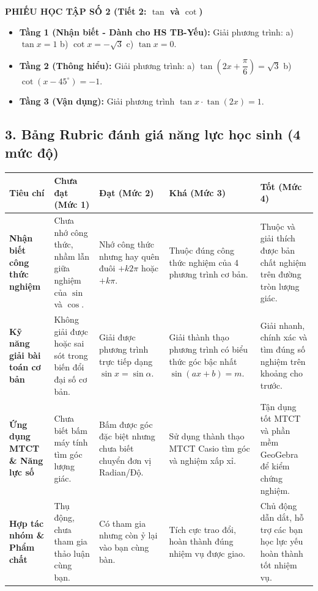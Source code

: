 \documentclass[12pt, a4paper]{article}
\begin{document}
\vspace{5pt}  
\noindent \textbf{PHIẾU HỌC TẬP SỐ 2 (Tiết 2: $\tan$ và $\cot$)}  
\begin{itemize}[leftmargin=0.6cm]  
    \item \textbf{Tầng 1 (Nhận biết - Dành cho HS TB-Yếu):}  
    Giải phương trình: a) $\tan x = 1$ \qquad b) $\cot x = -\sqrt{3}$ \qquad c) $\tan x = 0$.  
    \item \textbf{Tầng 2 (Thông hiểu):}  
    Giải phương trình: a) $\tan\left(2x + \dfrac{\pi}{6}\right) = \sqrt{3}$ \qquad b) $\cot\left(x - 45^\circ\right) = -1$.  
    \item \textbf{Tầng 3 (Vận dụng):}  
    Giải phương trình $\tan x \cdot \tan(2x) = 1$.  
\end{itemize}  
  
\subsection*{3. Bảng Rubric đánh giá năng lực học sinh (4 mức độ)}  
  
\begin{center}  
\small  
\begin{tabularx}{\textwidth}{|p{2.8cm}|X|X|X|X|}  
\hline  
\textbf{Tiêu chí} & \textbf{Chưa đạt (Mức 1)} & \textbf{Đạt (Mức 2)} & \textbf{Khá (Mức 3)} & \textbf{Tốt (Mức 4)} \\ \hline  
\textbf{Nhận biết công thức nghiệm} & Chưa nhớ công thức, nhầm lẫn giữa nghiệm của $\sin$ và $\cos$. & Nhớ công thức nhưng hay quên đuôi $+ k2\pi$ hoặc $+ k\pi$. & Thuộc đúng công thức nghiệm của 4 phương trình cơ bản. & Thuộc và giải thích được bản chất nghiệm trên đường tròn lượng giác. \\ \hline  
\textbf{Kỹ năng giải bài toán cơ bản} & Không giải được hoặc sai sót trong biến đổi đại số cơ bản. & Giải được phương trình trực tiếp dạng $\sin x = \sin\alpha$. & Giải thành thạo phương trình có biểu thức góc bậc nhất $\sin(ax+b)=m$. & Giải nhanh, chính xác và tìm đúng số nghiệm trên khoảng cho trước. \\ \hline  
\textbf{Ứng dụng MTCT \& Năng lực số} & Chưa biết bấm máy tính tìm góc lượng giác. & Bấm được góc đặc biệt nhưng chưa biết chuyển đơn vị Radian/Độ. & Sử dụng thành thạo MTCT Casio tìm góc và nghiệm xấp xỉ. & Tận dụng tốt MTCT và phần mềm GeoGebra để kiểm chứng nghiệm. \\ \hline  
\textbf{Hợp tác nhóm \& Phẩm chất} & Thụ động, chưa tham gia thảo luận cùng bạn. & Có tham gia nhưng còn ỷ lại vào bạn cùng bàn. & Tích cực trao đổi, hoàn thành đúng nhiệm vụ được giao. & Chủ động dẫn dắt, hỗ trợ các bạn học lực yếu hoàn thành tốt nhiệm vụ. \\ \hline  
\end{tabularx}  
\end{center}  
  
\end{document}
